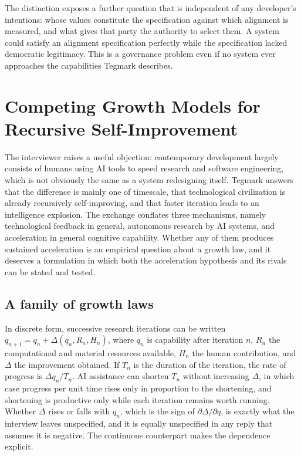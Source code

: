 \documentclass[11pt]{article}
\begin{document}
The distinction exposes a further question that is independent of any developer's intentions: whose values constitute the specification against which alignment is measured, and what gives that party the authority to select them. A system could satisfy an alignment specification perfectly while the specification lacked democratic legitimacy. This is a governance problem even if no system ever approaches the capabilities Tegmark describes.

\section{Competing Growth Models for Recursive Self-Improvement}

The interviewer raises a useful objection: contemporary development largely consists of humans using AI tools to speed research and software engineering, which is not obviously the same as a system redesigning itself. Tegmark answers that the difference is mainly one of timescale, that technological civilization is already recursively self-improving, and that faster iteration leads to an intelligence explosion. The exchange conflates three mechanisms, namely technological feedback in general, autonomous research by AI systems, and acceleration in general cognitive capability. Whether any of them produces sustained acceleration is an empirical question about a growth law, and it deserves a formulation in which both the acceleration hypothesis and its rivals can be stated and tested.

\subsection{A family of growth laws}

In discrete form, successive research iterations can be written $q_{n+1}=q_n+\Delta(q_n,R_n,H_n)$, where $q_n$ is capability after iteration $n$, $R_n$ the computational and material resources available, $H_n$ the human contribution, and $\Delta$ the improvement obtained. If $T_n$ is the duration of the iteration, the rate of progress is $\Delta q_n/T_n$. AI assistance can shorten $T_n$ without increasing $\Delta$, in which case progress per unit time rises only in proportion to the shortening, and shortening is productive only while each iteration remains worth running. Whether $\Delta$ rises or falls with $q_n$, which is the sign of $\partial\Delta/\partial q$, is exactly what the interview leaves unspecified, and it is equally unspecified in any reply that assumes it is negative. The continuous counterpart makes the dependence explicit.
\end{document}
